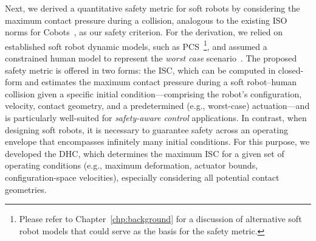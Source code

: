 Next, we derived a quantitative safety metric for soft robots by considering the maximum contact pressure during a collision, analogous to the existing ISO norms for \glspl{Cobot}~\citep{Isots_15066_2016}, as our safety criterion. For the derivation, we relied on established soft robot dynamic models, such as \gls{PCS}~\citep{renda2018discrete}\footnote{Please refer to Chapter~\ref{chp:background} for a discussion of alternative soft robot models that could serve as the basis for the safety metric.}, and assumed a constrained human model to represent the \emph{worst case} scenario~\citep{haddadin2009requirements}. The proposed safety metric is offered in two forms: the \gls{ISC}, which can be computed in closed-form and estimates the maximum contact pressure during a soft robot–human collision given a specific initial condition—comprising the robot’s configuration, velocity, contact geometry, and a predetermined (e.g., worst-case) actuation—and is particularly well-suited for \emph{safety-aware control} applications. In contrast, when designing soft robots, it is necessary to guarantee safety across an operating envelope that encompasses infinitely many initial conditions. For this purpose, we developed the \gls{DHC}, which determines the maximum \gls{ISC} for a given set of operating conditions (e.g., maximum deformation, actuator bounds, configuration-space velocities), especially considering all potential contact geometries.

